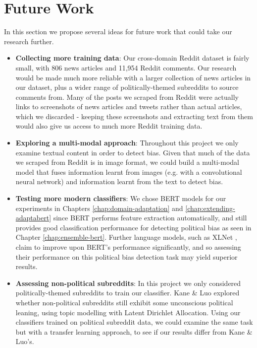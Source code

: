 \section{Future Work}

In this section we propose several ideas for future work that could take our research further.

\begin{itemize}
    \item \textbf{Collecting more training data}: Our cross-domain Reddit dataset is fairly small, with 806 news articles and 11,954 Reddit comments. Our research would be made much more reliable with a larger collection of news articles in our dataset, plus a wider range of politically-themed subreddits to source comments from. Many of the posts we scraped from Reddit were actually links to screenshots of news articles and tweets rather than actual articles, which we discarded - keeping these screenshots and extracting text from them would also give us access to much more Reddit training data.
    \item \textbf{Exploring a multi-modal approach}: Throughout this project we only examine textual content in order to detect bias. Given that much of the data we scraped from Reddit is in image format, we could build a multi-modal model that fuses information learnt from images (e.g. with a convolutional neural network) and information learnt from the text to detect bias.
    \item \textbf{Testing more modern classifiers}: We chose BERT models for our experiments in Chapters \ref{chap:domain-adaptation} and \ref{chap:extending-adaptabert} since BERT performs feature extraction automatically, and still provides good classification performance for detecting political bias as seen in Chapter \ref{chap:ensemble-bert}. Further language models, such as XLNet \cite{xlnet}, claim to improve upon BERT's performance significantly, and so assessing their performance on this political bias detection task may yield superior results.
    \item \textbf{Assessing non-political subreddits}: In this project we only considered politically-themed subreddits to train our classifier. Kane \& Luo \cite{kane} explored whether non-political subreddits still exhibit some unconscious political leaning, using topic modelling with Latent Dirichlet Allocation. Using our classifiers trained on political subreddit data, we could examine the same task but with a transfer learning approach, to see if our results differ from Kane \& Luo's.

\end{itemize}
